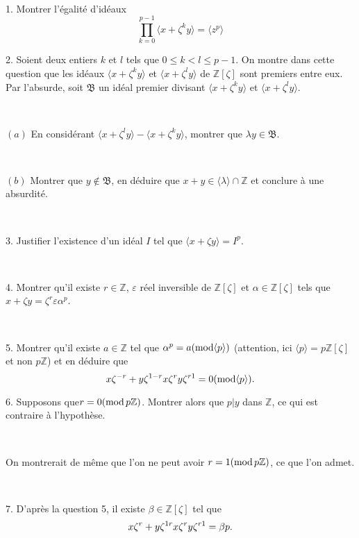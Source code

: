 \

1. Montrer l'{\'e}galit{\'e} d'id{\'e}aux
\[ \underset{k = 0}{\overset{p - 1}{\prod}} \langle x + \zeta^k y \rangle =
   \langle z^p \rangle \]


2. Soient deux entiers $k$ et $l$ tels que $0 \leqslant k < l \leqslant p -
1$. On montre dans cette question que les id{\'e}aux $\langle x + \zeta^k y
\rangle$ et $\langle x + \zeta^l y \rangle$ de $\mathbb{Z} [\zeta]$ sont
premiers entre eux. Par l'absurde, soit $\mathfrak{B}$ un id{\'e}al premier
divisant $\langle x + \zeta^k y \rangle$ et $\langle x + \zeta^l y \rangle$.

\

\quad$(a)$ En consid{\'e}rant $\langle x + \zeta^l y \rangle - \langle x +
\zeta^k y \rangle$, montrer que $\lambda y \in \mathfrak{B}$.

\

\quad$(b)$ Montrer que $y \nin \mathfrak{B}$, en d{\'e}duire que $x + y \in
\langle \lambda \rangle \cap \mathbb{Z}$ et conclure {\`a} une absurdit{\'e}.

\

3. Justifier l'existence d'un id{\'e}al $I$ tel que $\langle x + \zeta y
\rangle = I^p$.

\

4. Montrer qu'il existe $r \in \mathbb{Z}$, $\varepsilon$ r{\'e}el inversible
de $\mathbb{Z}[\zeta]$ et $\alpha \in \mathbb{Z}[\zeta]$ tels que $x + \zeta y
= \zeta^r \varepsilon \alpha^p$.

\

5. Montrer qu'il existe $a \in \mathbb{Z}$ tel que $\alpha^p = a (\tmop{mod}
\langle p \rangle)$ (attention, ici $\langle p \rangle = p\mathbb{Z}[\zeta]$
et non $p\mathbb{Z}$) et en d{\'e}duire que
\[ x \zeta^{- r} + y \zeta^{1 - r} \nonconverted{minus} x \zeta^r
   \nonconverted{minus} y \zeta^{r \nonconverted{minus} 1} = 0 (\tmop{mod}
   \langle p \rangle) . \]


6. Supposons que$r = 0 (\tmop{mod} p\mathbb{Z})$. Montrer alors que $p | y$
dans $\mathbb{Z}$, ce qui est contraire {\`a} l'hypoth{\`e}se.

\

On montrerait de m{\^e}me que l'on ne peut avoir $r = 1 (\tmop{mod}
p\mathbb{Z})$, ce que l'on admet.

\

7. D'apr{\`e}s la question 5, il existe $\beta \in \mathbb{Z}[\zeta]$ tel que
\[ x \zeta^{\nonconverted{minus} r} + y \zeta^{1 \nonconverted{minus} r}
   \nonconverted{minus} x \zeta^r \nonconverted{minus} y \zeta^{r
   \nonconverted{minus} 1} = \beta p. \]


